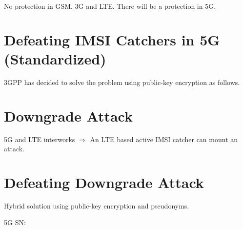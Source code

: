 \documentclass[portrait,a0]{a0poster}
\begin{document}
\begin{multicols}{2}
\begin{center}
    
\end{center}

\begin{Large}
No protection in GSM, 3G and LTE. There will be a protection in 5G.  
\end{Large}




\section{Defeating IMSI Catchers in 5G (Standardized)}
3GPP has decided to solve the problem using public-key encryption as follows.

\begin{center}
    
\end{center}



\section{Downgrade Attack}

\begin{Large}
5G and LTE interworks $\Rightarrow$ An LTE based active IMSI catcher can mount an attack. 
\end{Large}



\begin{center}
    
\end{center}


\section{Defeating Downgrade Attack}


 \begin{Large}
 Hybrid solution using public-key encryption and pseudonyms. 
 \end{Large}
 
 

\vspace{.5cm}
{\Large{}\textcolor{facultyColor}{\MakeUppercase{5G SN:}} \MakeUppercase{}}\\

\begin{center}
    
\end{center}


\end{multicols}
\end{document}
